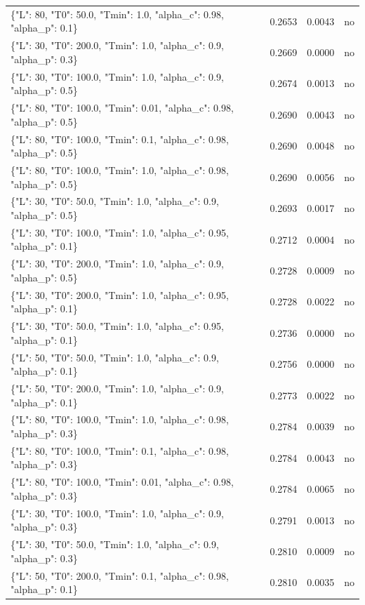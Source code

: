 \begin{table}[htbp]
\begin{tabular}{lrrr}
\{"L": 80, "T0": 50.0, "Tmin": 1.0, "alpha\_c": 0.98, "alpha\_p": 0.1\} & 0.2653 & 0.0043 & no \\
\{"L": 30, "T0": 200.0, "Tmin": 1.0, "alpha\_c": 0.9, "alpha\_p": 0.3\} & 0.2669 & 0.0000 & no \\
\{"L": 30, "T0": 100.0, "Tmin": 1.0, "alpha\_c": 0.9, "alpha\_p": 0.5\} & 0.2674 & 0.0013 & no \\
\{"L": 80, "T0": 100.0, "Tmin": 0.01, "alpha\_c": 0.98, "alpha\_p": 0.5\} & 0.2690 & 0.0043 & no \\
\{"L": 80, "T0": 100.0, "Tmin": 0.1, "alpha\_c": 0.98, "alpha\_p": 0.5\} & 0.2690 & 0.0048 & no \\
\{"L": 80, "T0": 100.0, "Tmin": 1.0, "alpha\_c": 0.98, "alpha\_p": 0.5\} & 0.2690 & 0.0056 & no \\
\{"L": 30, "T0": 50.0, "Tmin": 1.0, "alpha\_c": 0.9, "alpha\_p": 0.5\} & 0.2693 & 0.0017 & no \\
\{"L": 30, "T0": 100.0, "Tmin": 1.0, "alpha\_c": 0.95, "alpha\_p": 0.1\} & 0.2712 & 0.0004 & no \\
\{"L": 30, "T0": 200.0, "Tmin": 1.0, "alpha\_c": 0.9, "alpha\_p": 0.5\} & 0.2728 & 0.0009 & no \\
\{"L": 30, "T0": 200.0, "Tmin": 1.0, "alpha\_c": 0.95, "alpha\_p": 0.1\} & 0.2728 & 0.0022 & no \\
\{"L": 30, "T0": 50.0, "Tmin": 1.0, "alpha\_c": 0.95, "alpha\_p": 0.1\} & 0.2736 & 0.0000 & no \\
\{"L": 50, "T0": 50.0, "Tmin": 1.0, "alpha\_c": 0.9, "alpha\_p": 0.1\} & 0.2756 & 0.0000 & no \\
\{"L": 50, "T0": 200.0, "Tmin": 1.0, "alpha\_c": 0.9, "alpha\_p": 0.1\} & 0.2773 & 0.0022 & no \\
\{"L": 80, "T0": 100.0, "Tmin": 1.0, "alpha\_c": 0.98, "alpha\_p": 0.3\} & 0.2784 & 0.0039 & no \\
\{"L": 80, "T0": 100.0, "Tmin": 0.1, "alpha\_c": 0.98, "alpha\_p": 0.3\} & 0.2784 & 0.0043 & no \\
\{"L": 80, "T0": 100.0, "Tmin": 0.01, "alpha\_c": 0.98, "alpha\_p": 0.3\} & 0.2784 & 0.0065 & no \\
\{"L": 30, "T0": 100.0, "Tmin": 1.0, "alpha\_c": 0.9, "alpha\_p": 0.3\} & 0.2791 & 0.0013 & no \\
\{"L": 30, "T0": 50.0, "Tmin": 1.0, "alpha\_c": 0.9, "alpha\_p": 0.3\} & 0.2810 & 0.0009 & no \\
\{"L": 50, "T0": 200.0, "Tmin": 0.1, "alpha\_c": 0.98, "alpha\_p": 0.1\} & 0.2810 & 0.0035 & no \\

\end{tabular}
\end{table}
